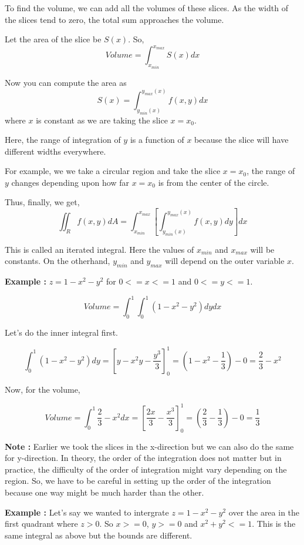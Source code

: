 To find the volume, we can add all the volumes of these slices.
As the width of the slices tend to zero, the total sum approaches the volume.

Let the area of the slice be $S(x)$. So, $$ Volume =  \int_{x_{min}}^{x_{max}} S(x) dx $$

Now you can compute the area as $$ S(x) = \int_{y_{min}(x)}^{y_{max}(x)} f(x, y) dx $$ where $x$ is constant as we are taking the slice $x = x_0$.

Here, the range of integration of $y$ is a function of $x$ because the slice will have different widths everywhere.

For example, we we take a circular region and take the slice $x = x_0$, the range of $y$ changes depending upon how far $x = x_0$ is from the center of the circle.

Thus, finally, we get,
$$ \iint_R f(x, y) dA = \int_{x_{min}}^{x_{max}} \left[ \int_{y_{min}(x)}^{y_{max}(x)} f(x, y) dy  \right] dx $$

This is called an iterated integral. Here the values of $x_{min}$ and $x_{max}$ will be constants.
On the otherhand, $y_{min}$ and $y_{max}$ will depend on the outer variable $x$.


{\bf Example : } $z = 1 - x^2 - y^2$ for $0 <= x <= 1$ and $0 <= y <= 1$.

$$Volume = \int_0^1 \int_0^1 (1 - x^2 - y^2) dy dx$$

Let's do the inner integral first.

$$ \int_0^1 (1-x^2-y^2) dy 
    = \left[ y - x^2y - \frac{y^3}{3} \right]_0^1 
    = \left( 1 - x^2 - \frac{1}{3} \right) - 0 = \frac{2}{3} - x^2
$$

Now, for the volume,

$$ Volume = \int_0^1 \frac{2}{3} - x^2 dx 
    = \left[ \frac{2x}{3} - \frac{x^3}{3} \right]_0^1 
    = \left( \frac{2}{3} - \frac{1}{3} \right) - 0 = \frac{1}{3}
$$


{\bf Note : }
Earlier we took the slices in the x-direction but we can also do the same for y-direction. 
In theory, the order of the integration does not matter but in practice, the difficulty of the order of integration might vary depending on the region.
So, we have to be careful in setting up the order of the integration because one way might be much harder than the other.

\pagebreak

{\bf Example : }
Let's say we wanted to intergrate $z = 1 - x^2 - y^2$ over the area in the first quadrant where $z > 0$.
So $x >= 0$, $y >= 0$ and $x^2 + y^2 <= 1$. This is the same integral as above but the bounds are different.

